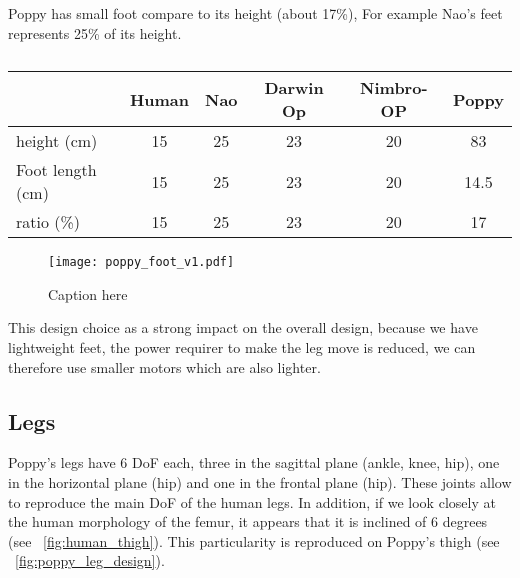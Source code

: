

Poppy has small foot compare to its height (about 17\%), For example Nao's feet represents 25\% of its height.

\begin{table}[h]
\centering
\begin{tabular}{l| c c c c c}
    & Human & Nao & Darwin Op & Nimbro-OP & Poppy \\
    \hline
    height (cm) & 15 & 25 & 23 & 20 & 83\\
    Foot length (cm) & 15 & 25 & 23 & 20 & 14.5\\
    ratio (\%) & 15 & 25 & 23 & 20 & 17\\
\end{tabular}
\caption{}
\label{tab:poppy_feet_compare}
\end{table}


\begin{figure}[p]
    \begin{center}
        \texttt{[image: poppy\_foot\_v1.pdf]}
    \end{center}
    \caption{Caption here}
    \label{fig:poppy-foot-v1-design}
\end{figure}


This design choice as a strong impact on the overall design, because we have lightweight feet, the power requirer to make the leg move is reduced, we can therefore use smaller motors which are also lighter.


\subsection{Legs} %

Poppy's legs have 6 DoF each, three in the sagittal plane (ankle, knee, hip), one in the horizontal plane (hip) and one in the frontal plane (hip). These joints allow to reproduce the main DoF of the human legs. In addition, if we look closely at the human morphology of the femur, it appears that it is inclined of 6 degrees (see \figurename~\ref{fig:human_thigh}). This particularity is reproduced on Poppy's thigh (see \figurename~\ref{fig:poppy_leg_design}).

